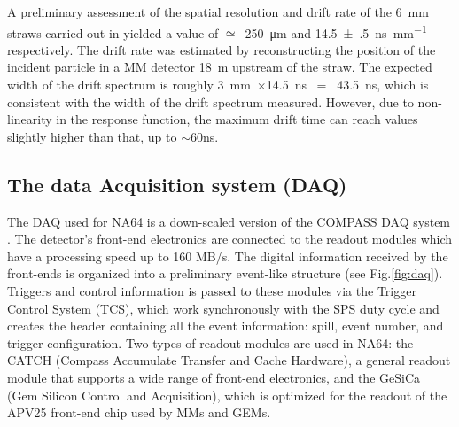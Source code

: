 A preliminary assessment of the spatial resolution and drift rate of the 6~mm straws carried out in \cite{Volkov:2019qhb} yielded a value of $\simeq$~\SI{250}{\micro\metre} and \SI[separate-uncertainty = true,per-mode=symbol]{14.5(5)}{\nano\second\per\milli\metre} respectively. The drift rate was estimated by reconstructing the position of the incident particle in a MM detector \SI{18}{\metre} upstream of the straw. The expected width of the drift spectrum is roughly 3~mm~$\times$14.5~ns~ = ~43.5~ns, which is consistent with the width of the drift spectrum measured. However, due to non-linearity in the response function, the maximum drift time can reach values slightly higher than that, up to $\sim$60ns.


\subsection{The data Acquisition system (DAQ)}
\label{ch2:sec:daq}

The DAQ used for NA64 is a down-scaled version of the COMPASS DAQ system \cite{Bodlak_2013,COMPASS-daq}. The detector's front-end electronics are connected to the readout modules which have a processing speed up to 160 MB/s. The digital information received by the front-ends is organized into a preliminary event-like structure (see Fig.\ref{fig:daq}). Triggers and control information is passed to these modules via the Trigger Control System (TCS), which work synchronously with the SPS duty cycle and creates the header containing all the event information: spill, event number, and trigger configuration. Two types of readout modules are used in NA64: the CATCH (Compass Accumulate Transfer and Cache Hardware), a general readout module that supports a wide range of front-end electronics, and the GeSiCa (Gem Silicon Control and Acquisition), which is optimized for the readout of the APV25 front-end chip used by MMs and GEMs.

